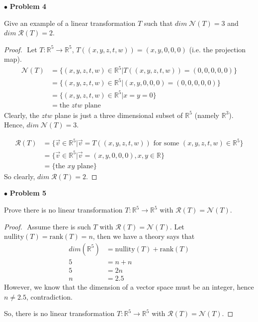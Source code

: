 \documentclass{article}
\begin{document}
\newpage
$ \bullet$ \textbf{Problem 4}
\medskip

\begin{itshape}
Give an example of a linear transformation $T$ such that $dim \; \mathcal{N}(T) = 3$ and  $dim \; \mathcal{R}(T) =2$.
\end{itshape}
\medskip

\begin{proof}
$ $\newline
Let $T: \mathbb{R}^5 \to \mathbb{R}^5$, $T((x,y,z,t,w)) = (x,y,0,0,0)$ (i.e. the projection map).
\begin{align*}
\mathcal{N}(T) &= \{ (x,y,z,t,w) \in \mathbb{R}^5 | T((x,y,z,t,w))  = (0,0,0,0,0) \} \\
&= \{ (x,y,z,t,w) \in \mathbb{R}^5 | (x,y,0,0,0) = (0,0,0,0,0) \} \\ 
&= \{ (x,y,z,t,w) \in \mathbb{R}^5 | x = y =0 \}\\
&= \text{the }ztw \text{ plane}
\end{align*}
Clearly, the $ztw$ plane is just a three dimensional subset of $\mathbb{R}^5$ (namely $\mathbb{R}^3$). Hence, $dim \; \mathcal{N}(T) = 3$.

\begin{align*}
\mathcal{R}(T) &= \{ \vec{v} \in \mathbb{R}^5 | \vec{v} = T((x,y,z,t,w)) \text{ for some } (x,y,z,t,w) \in \mathbb{R}^5 \} \\
&= \{ \vec{v} \in \mathbb{R}^5 | \vec{v} = (x,y,0,0,0), x,y \in \mathbb{R} \} \\
&= \{ \text{the } xy \text{ plane} \}
\end{align*}
So clearly, $dim \; \mathcal{R}(T) = 2$.
\end{proof}

\newpage
$ \bullet$ \textbf{Problem 5}
\medskip

\begin{itshape}
Prove there is no linear transformation $T: \mathbb{R}^5 \to \mathbb{R}^5$ with $\mathcal{R}(T) = \mathcal{N}(T)$.
\end{itshape}
\medskip

\begin{proof}
$ $\newline
Assume there is such $T$ with $\mathcal{R}(T) = \mathcal{N}(T)$. Let $\text{nullity}(T) = \text{rank}(T) = n$, then we have a theory says that
\begin{align*}
dim(\mathbb{R}^5) &= \text{nullity}(T) + \text{rank}(T) \\
5 &= n + n \\
5 &= 2n \\
n &= 2.5
\end{align*}
However, we know that the dimension of a vector space must be an integer, hence $n \ne 2.5$, contradiction.

So, there is no linear transformation $T: \mathbb{R}^5 \to \mathbb{R}^5$ with $\mathcal{R}(T) = \mathcal{N}(T)$.
\end{proof}
\end{document}
